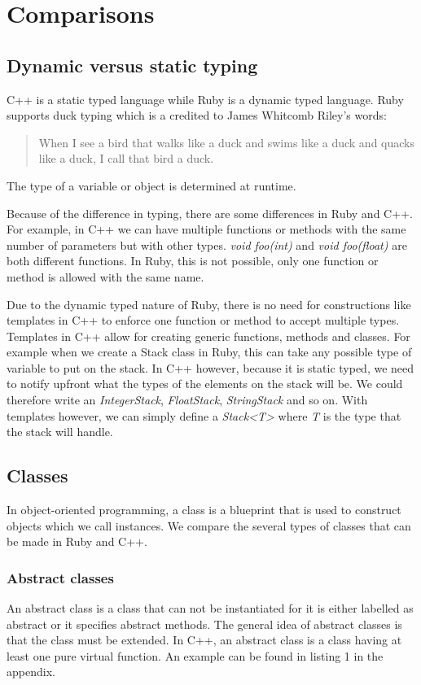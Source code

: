 \documentclass[10pt,a4paper,twocolumn]{article}
\begin{document}
\section{Comparisons}

\subsection{Dynamic versus static typing}
C++ is a static typed language while Ruby is a dynamic typed language. Ruby supports duck typing which is a credited to James Whitcomb Riley's words:

\begin{quote}When I see a bird that walks like a duck and swims like a duck and quacks like a duck, I call that bird a duck.\end{quote}

The type of a variable or object is determined at runtime.

Because of the difference in typing, there are some differences in Ruby and C++. For example, in C++ we can have multiple functions or methods with the same number of parameters but with other types. \textit{void foo(int)} and \textit{void foo(float)} are both different functions. In Ruby, this is not possible, only one function or method is allowed with the same name.

Due to the dynamic typed nature of Ruby, there is no need for constructions like templates in C++ to enforce one function or method to accept multiple types. Templates in C++ allow for creating generic functions, methods and classes. For example when we create a Stack class in Ruby, this can take any possible type of variable to put on the stack. In C++ however, because it is static typed, we need to notify upfront what the types of the elements on the stack will be. We could therefore write an \textit{IntegerStack}, \textit{FloatStack}, \textit{StringStack} and so on. With templates however, we can simply define a \textit{Stack\textless T\textgreater } where \textit{T} is the type that the stack will handle.

\subsection{Classes}
In object-oriented programming, a class is a blueprint that is used to construct objects which we call instances. We compare the several types of classes that can be made in Ruby and C++.

\subsubsection{Abstract classes}
An abstract class is a class that can not be instantiated for it is either labelled as abstract or it specifies abstract methods. The general idea of abstract classes is that the class must be extended. In C++, an abstract class is a class having at least one pure virtual function. An example can be found in listing 1 in the appendix.
\end{document}

